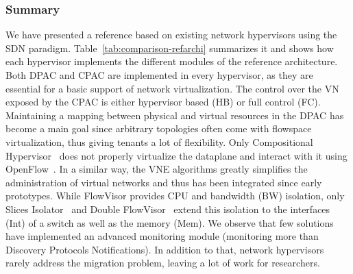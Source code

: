 \subsubsection{Summary}
We have presented a reference based on existing network hypervisors using the SDN paradigm.
Table~\ref{tab:comparison-refarchi} summarizes it and shows how each hypervisor implements the different modules of the reference architecture.
Both DPAC and CPAC are implemented in every hypervisor, as they are essential for a basic support of network virtualization.
The control over the VN exposed by the CPAC is either hypervisor based (HB) or full control (FC).
Maintaining a mapping between physical and virtual resources in the DPAC has become a main goal since arbitrary topologies often come with flowspace virtualization, thus giving tenants a lot of flexibility.
Only Compositional Hypervisor~\cite{CompositionalHypervisor-Jin2014} does not properly virtualize the dataplane and interact with it using OpenFlow~\cite{Openflow-McKeown2008}.
In a similar way, the VNE algorithms greatly simplifies the administration of virtual networks and thus has been integrated since early prototypes.
While FlowVisor provides CPU and bandwidth (BW) isolation, only Slices Isolator~\cite{SlicesIsolator-El-Azzab2011} and Double FlowVisor~\cite{DoubleFV-Yin2013} extend this isolation to the interfaces (Int) of a switch as well as the memory (Mem).
We observe that few solutions have implemented an advanced monitoring module (\ie monitoring more than Discovery Protocols Notifications).
In addition to that, network hypervisors rarely address the migration problem, leaving a lot of work for researchers.



